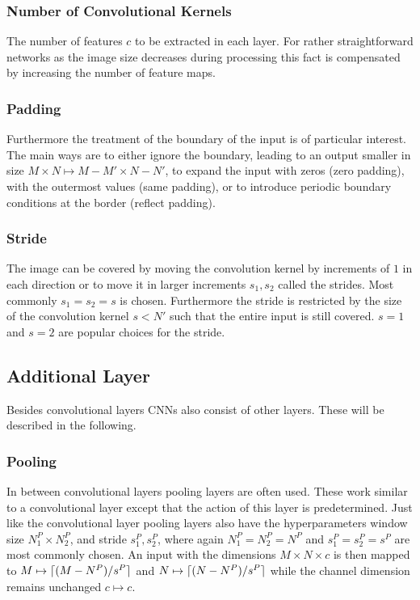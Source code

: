 \subsubsection{Number of Convolutional Kernels}
The number of features $c$ to be extracted in each layer. For rather straightforward networks as the image size decreases during processing this fact is compensated by increasing the number of feature maps. 

\subsubsection{Padding}
Furthermore the treatment of the boundary of the input is of particular interest. The main ways are to either ignore the boundary, leading to an output smaller in size $M\times N \mapsto M-M' \times N-N'$, to expand the input with zeros (zero padding), with the outermost values (same padding), or to introduce periodic boundary conditions at the border (reflect padding).

\subsubsection{Stride}
The image can be covered by moving the convolution kernel by increments of $1$ in each direction or to move it in larger increments $s_1,s_2$ called the strides. Most commonly $s_1 = s_2 = s$ is chosen. Furthermore the stride is restricted by the size of the convolution kernel $s<N'$ such that the entire input is still covered. $s=1$ and $s=2$ are popular choices for the stride.

\subsection{Additional Layer}
Besides convolutional layers CNNs also consist of other layers. These will be described in the following.

\subsubsection{Pooling}
In between convolutional layers pooling layers are often used. These work similar to a convolutional layer except that the action of this layer is predetermined. Just like the convolutional layer pooling layers also have the hyperparameters window size $N^P_1 \times N^P_2$, and stride $s_1^P,s_2^P$, where again $N^P_1 = N^P_2 = N^P$ and $s_1^P=s_2^P=s^P$ are most commonly chosen. An input with the  dimensions $M \times N \times c$ is then mapped to  $M \mapsto \lceil(M-N^P)/s^P\rceil $ and $N \mapsto \lceil(N-N^P)/s^P\rceil$ while the channel dimension remains unchanged $c \mapsto c$.\\

